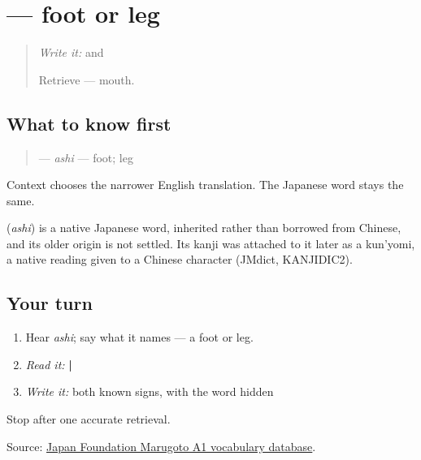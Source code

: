 \section[\texorpdfstring{\ja{あし} (ashi)}{あし (ashi)}]{ — foot or leg}

\label{lesson:JA-C11-ashi}



\begin{quote}
\emph{Write it:} \textbf{} and \textbf{}

Retrieve \textbf{} — mouth.
\end{quote}

\subsection*{What to know first}
\begin{quote}
\textbf{} — \emph{ashi} — foot; leg
\end{quote}

Context chooses the narrower English translation. The Japanese word stays the same.

\begin{cousinweb}
\textbf{} (\emph{ashi}) is a native Japanese word, inherited rather than borrowed from Chinese, and its older origin is not settled. Its kanji was attached to it later as a kun'yomi, a native reading given to a Chinese character (JMdict, KANJIDIC2).
\end{cousinweb}

\subsection*{Your turn}
\begin{enumerate}
\raggedright
  \item Hear \emph{ashi}; say what it names — a foot or leg.
  \item \emph{Read it:} \textbf{ | }
  \item \emph{Write it:} both known signs, with the word hidden
\end{enumerate}

\begin{tcolorbox}[breakable,colback=teal!4,colframe=teal!35!black,title={Before you move on}]
Stop after one accurate retrieval.

Source: \href{https://words.marugotoweb.jp/}{Japan Foundation Marugoto A1 vocabulary database}.
\end{tcolorbox}
